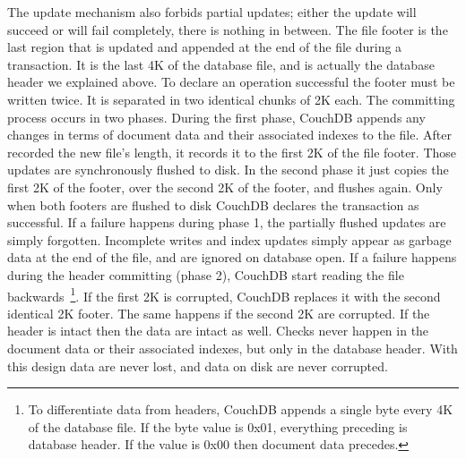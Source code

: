 \begin{description}
    The update mechanism also forbids partial updates; either the update will
    succeed or will fail completely, there is nothing in between. The file
    footer is the last region that is updated and appended at the end of the file
    during a transaction. It is the last 4K of the database file, and is actually
    the database header we explained above. To declare an operation successful
    the footer must be written twice. It is separated in two identical chunks
    of 2K each. The committing process occurs in two phases. During the first
    phase, CouchDB appends any changes in terms of document data and their
    associated indexes to the file. After recorded the new file's length, it
    records it to the first 2K of the file footer. Those updates are
    synchronously flushed to disk. In the second phase it just copies the first
    2K of the footer, over the second 2K of the footer, and flushes again. Only
    when both footers are flushed to disk CouchDB declares the transaction as
    successful. If a failure happens during phase 1, the partially flushed
    updates are simply forgotten. Incomplete writes and index updates simply
    appear as garbage data at the end of the file, and are ignored on database
    open. If a failure happens during the header committing (phase 2), CouchDB
    start reading the file backwards~\footnote{To differentiate data from
    headers, CouchDB appends a single byte every 4K of the database file. If the
    byte value is 0x01, everything preceding is database header. If the value is
    0x00 then document data precedes.}. If the first 2K is corrupted, CouchDB
    replaces it with the second identical 2K footer. The same happens if the
    second 2K are corrupted. If the header is intact then the data are intact as
    well. Checks never happen in the document data or their associated indexes,
    but only in the database header. With this design data are never lost, and
    data on disk are never corrupted.


\end{description}
